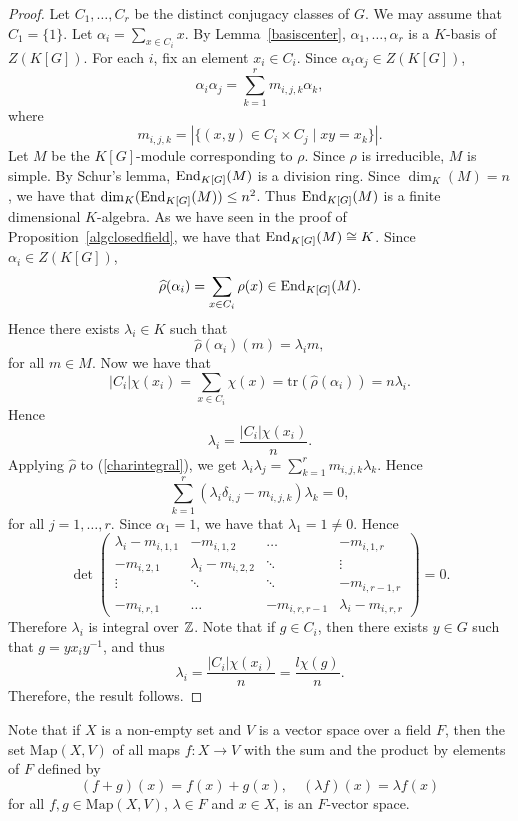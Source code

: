 \begin{proof}
    Let $C_1,\dots ,C_r$ be the distinct conjugacy classes of $G$. We may assume that $C_1=\{ 1\}$. 
    Let $\alpha_i=\sum_{x\in C_i}x$. By Lemma~\ref{basiscenter}, $\alpha_1,\dots ,\alpha_r$ is a $K$-basis of $Z(K[G])$.
    For each $i$, fix an element $x_i\in C_i$. Since $\alpha_i\alpha_j\in Z(K[G])$, 
    \begin{equation}\label{charintegral} \alpha_i\alpha_j=\sum_{k=1}^rm_{i,j,k}\alpha_k,\end{equation}
    where 
    \[ m_{i,j,k}=|\{ (x,y)\in C_i\times C_j\mid xy=x_k\}|.\]
    Let $M$ be the $K[G]$-module corresponding to $\rho$. Since $\rho$ is irreducible, $M$ is simple. By Schur's lemma,
    $\operatorname{End}_{K[G]}(M)$ is a division ring. Since $\dim_K(M)=n$, we have that $\dim_K(\operatorname{End}_{K[G]}(M))\leq n^2$.
    Thus $\operatorname{End}_{K[G]}(M)$ is a finite dimensional $K$-algebra. As we have seen in the proof of Proposition~\ref{algclosedfield},
    we have that $\operatorname{End}_{K[G]}(M)\cong K$. Since $\alpha_i\in Z(K[G])$,
    \[ \widehat{\rho}(\alpha_i)=\sum_{x\in C_i}\rho(x)\in\operatorname{End}_{K[G]}(M).\]
    Hence there exists $\lambda_i\in K$ such that
    \[\widehat{\rho}(\alpha_i)(m)=\lambda_im,\]
    for all $m\in M$. Now we have that
    \[ |C_i|\chi(x_i)=\sum_{x\in C_i}\chi(x)=\mathrm{tr} (\widehat{\rho}(\alpha_i))=n\lambda_i.\]
    Hence 
    \[\lambda_i=\frac{|C_i|\chi(x_i)}{n}.\]
    Applying $\widehat{\rho}$ to (\ref{charintegral}), we get
    $\lambda_i\lambda_j=\sum_{k=1}^rm_{i,j,k}\lambda_k$. Hence
    \[ \sum_{k=1}^r(\lambda_i\delta_{i,j}-m_{i,j,k})\lambda_k=0,\]
    for all $j=1,\dots, r$. Since $\alpha_1=1$, we have that $\lambda_1=1\neq 0$. Hence
    \[\det\left(\begin{array}{cccc}
    \lambda_i-m_{i,1,1}&-m_{i,1,2}&\ldots &-m_{i,1,r}\\
    -m_{i,2,1}&\lambda_i-m_{i,2,2}&\ddots&\vdots\\
    \vdots&\ddots&\ddots&-m_{i,r-1,r}\\
    -m_{i,r,1}&\ldots&-m_{i,r,r-1}&\lambda_i-m_{i,r,r}
    \end{array}\right)=0.\]
    Therefore $\lambda_i$ is integral over $\mathbb{Z}$. Note that if $g\in C_i$, then there exists $y\in G$ such that $g=yx_iy^{-1}$, and thus
    \[\lambda_i=\frac{|C_i|\chi(x_i)}{n}=\frac{l\chi(g)}{n}.\]
    Therefore, the result follows.
\end{proof}

Note that if $X$ is a non-empty set and $V$ is a vector space over a field $F$, then the set 
$\mathrm{Map}(X,V)$ of all maps $f\colon X\rightarrow V$ with the sum and the product by elements of $F$ defined by
\[(f+g)(x)=f(x)+g(x),\quad (\lambda f)(x)=\lambda f(x)\]
for all $f,g\in\mathrm{Map}(X,V)$, $\lambda\in F$ and $x\in X$, is an $F$-vector space.


